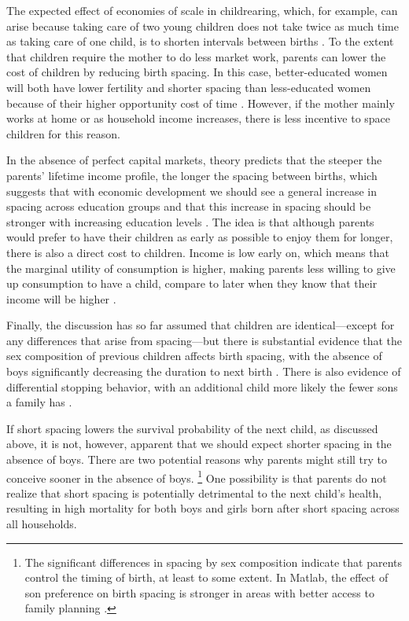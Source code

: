 \documentclass[12pt,letterpaper]{article}
\begin{document}
The expected effect of economies of scale in childrearing, which, for example, 
can arise because taking care of two young children does not take twice as much 
time as taking care of one child, is to shorten intervals between births
\citep{Vijverberg1982}.
To the extent that children require the mother to do less market work, parents 
can lower the cost of children by reducing birth spacing.
In this case, better-educated women will both have lower fertility and shorter
spacing than less-educated women because of their higher opportunity cost of time 
\citep{Ross1974,Newman1984}.
However, if the mother mainly works at home or as household income increases, there 
is less incentive to space children for this reason.

In the absence of perfect capital markets, theory predicts that the steeper 
the parents' lifetime income profile, the longer the spacing between births, 
which suggests that with economic development we should see a general increase 
in spacing across education groups and that this increase in spacing should be 
stronger with increasing education levels
\citep{Heckman1976,wolpin84,Newman1988}.
The idea is that although parents would prefer to have their children as early 
as possible to enjoy them for longer, there is also a direct cost to children.
Income is low early on, which means that the marginal utility of consumption is 
higher, making parents less willing to give up consumption to have a child, 
compare to later when they know that their income will be higher 
\citep{Newman1984,Happel1984}.

Finally, the discussion has so far assumed that children are identical---except 
for any differences that arise from spacing---but there is substantial evidence 
that the sex composition of previous children affects birth spacing, with the
absence of boys significantly decreasing the duration to next birth
\citep{Haughton1995,Haughton1996,Rahman1993,Bhalotra2008,Kumar2016,Soest2018}.
There is also evidence of differential stopping behavior, with an additional child 
more likely the fewer sons a family has 
\citep{repetto72,Das1987,Arnold1997,arnold98,clark00,Basu2010,Barcellos2014}.

If short spacing lowers the survival probability of the next child, as discussed above,
it is not, however, apparent that we should expect shorter spacing in the absence of boys.
There are two potential reasons why parents might still try to conceive sooner 
in the absence of boys.%
\footnote{
The significant differences in spacing by sex composition indicate that
parents control the timing of birth, at least to some extent.
In Matlab, the effect of son preference on birth spacing is stronger in 
areas with better access to family planning \citep{Rahman1993}.
}
One possibility is that parents do not realize that short spacing is potentially
detrimental to the next child's health, resulting in high mortality for both boys 
and girls born after short spacing across all households.
\end{document}
